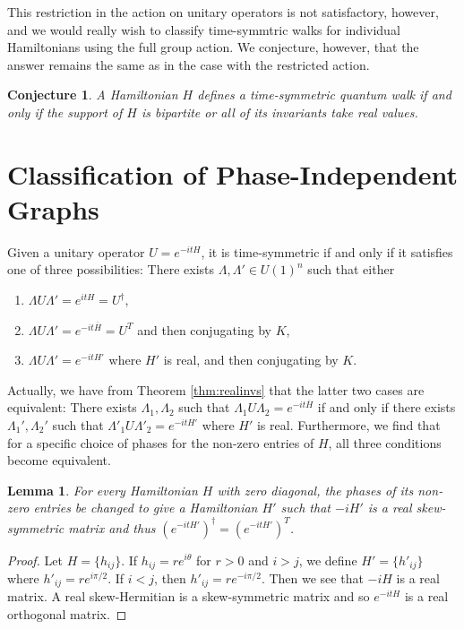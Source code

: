 \documentclass[twocolumn,superscriptaddress]{revtex4-1}
\theoremstyle{plain}
\newtheorem{lemma}[theorem]{Lemma}
\newtheorem{conjecture}[theorem]{Conjecture}
\theoremstyle{definition}
\theoremstyle{definition}
\theoremstyle{definition}
\theoremstyle{definition}
\theoremstyle{definition}
\theoremstyle{definition}
\begin{document}
This restriction in the action on unitary operators is not satisfactory, however, and we would really wish to classify time-symmtric walks for individual Hamiltonians using the full group action. We conjecture, however, that the answer remains the same as in the case with the restricted action.
\begin{conjecture}
 A Hamiltonian $H$ defines a time-symmetric quantum walk if and only if the support of $H$ is bipartite or all of its invariants take real values.
\end{conjecture}

\section{Classification of Phase-Independent Graphs}

Given a unitary operator $U=e^{-itH}$, it is time-symmetric if and only if it satisfies one of three possibilities: There exists $\Lambda,\Lambda'\in U(1)^n$ such that either
\begin{enumerate}
 \item $\Lambda U\Lambda'=e^{itH}=U^\dagger$,
 \item $\Lambda U \Lambda'=e^{-it\overline{H}}=U^T$ and then conjugating by $K$,
 \item $\Lambda U\Lambda'=e^ {-it H'}$ where $H'$ is real, and then conjugating by $K$.
\end{enumerate}
Actually, we have from Theorem \ref{thm:realinvs} that the latter two cases are equivalent: There exists $\Lambda_1,\Lambda_2$ such that $\Lambda_1 U \Lambda_2=e^{-it\overline{H}}$ if and only if there exists $\Lambda_1',\Lambda_2'$ such that $\Lambda'_1 U\Lambda'_2=e^ {-it H'}$ where $H'$ is real. Furthermore, we find that for a specific choice of phases for the non-zero entries of $H$, all three conditions become equivalent.

\begin{lemma}\label{lem:skewsymmetric}
 For every Hamiltonian $H$ with zero diagonal, the phases of its non-zero entries be changed to give a Hamiltonian $H'$ such that $-iH'$ is a real skew-symmetric matrix and thus $(e^{-itH'})^\dagger=(e^{-itH'})^T$.
\end{lemma}
\begin{proof}
 Let $H=\{h_{ij}\}$. If $h_{ij}=re^{i\theta}$ for $r>0$ and $i>j$, we define $H'=\{h'_{ij}\}$ where $h'_{ij}=re^{i\pi/2}$. If $i<j$, then $h'_{ij}=re^{-i\pi/2}$. Then we see that $-iH$ is a real matrix. A real skew-Hermitian is a skew-symmetric matrix and so $e^{-itH}$ is a real orthogonal matrix.
\end{proof}
\end{document}
